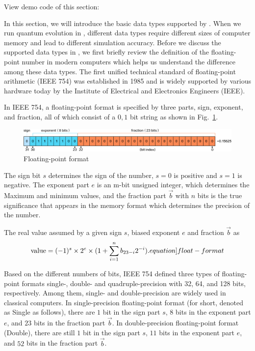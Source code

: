 View demo code of this section: 

In this section, we will introduce the basic data types supported by \MindQuantum. When we run quantum evolution in \MindQuantum, different data types require different sizes of computer memory and lead to different simulation accuracy.
Before we discuss the supported data types in \MindQuantum, we first briefly review the definition of the floating-point number in modern computers which helps us understand the difference among these data types.
The first unified technical standard of floating-point arithmetic (IEEE 754) \cite{8766229} was established in 1985 and is widely supported by various hardware today by the Institute of Electrical and Electronics Engineers (IEEE).

In IEEE 754, a floating-point format is specified by three parts, sign, exponent, and fraction, all of which consist of a ${0,1}$ bit string as shown in Fig.~\ref{fig:ieee}.

\begin{figure}[h]
    \centering
    \includegraphics[width=\linewidth]{2.1_figures/Float_example.png}
    \caption{Floating-point format}
    \label{fig:ieee}
\end{figure}

The sign bit $s$ determines the sign of the number, $s=0$ is positive and $s=1$ is negative.
The exponent part $e$ is an m-bit unsigned integer, which determines the Maximum and minimum values, and the fraction part $\vec{b}$ with $n$ bits is the true significance that appears in the memory format which determines the precision of the number.

The real value assumed by a given sign $s$, biased exponent $e$ and fraction $\vec{b}$ as
\begin{equation}
    \mathrm{value} = (-1)^{s}\times 2^{e}\times (1+\sum_{i=1}^nb_{23-i}2^{-i}).
\label[equation]{float-format}
\end{equation}

Based on the different numbers of bits, IEEE 754 defined three types of floating-point formats single-, double- and quadruple-precision with 32, 64, and 128 bits, respectively.
Among them, single- and double-precision are widely used in classical computers.
In single-precision floating-point format (for short, denoted as Single as follows), there are $1$ bit in the sign part $s$, $8$ bits in the exponent part $e$, and $23$ bits in the fraction part $\vec{b}$.
In double-precision floating-point format (Double), there are still $1$ bit in the sign part $s$, $11$ bits in the exponent part $e$, and $52$ bits in the fraction part $\vec{b}$.

